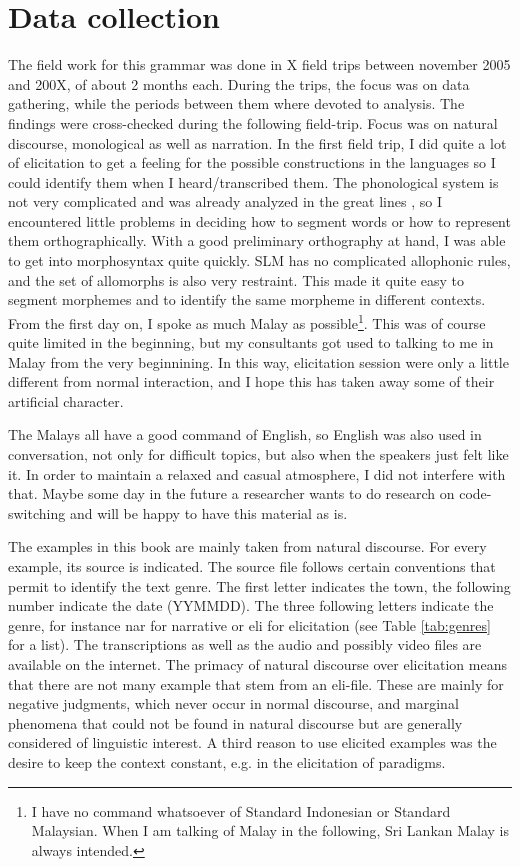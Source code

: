 \section{Data collection}
The field work for this grammar was done in X field trips between november 2005 and 200X, of about 2 months each. During the trips, the focus was on data gathering, while the periods between them where devoted to analysis. The findings were cross-checked during the following field-trip. Focus was on natural discourse, monological as well as narration. In the first field trip, I did quite a lot of elicitation to get a feeling for the possible constructions in the languages so I could identify them when I heard/transcribed them. The phonological system is not very complicated and was already analyzed in the great lines \citep{Bichsel}, so I encountered little problems in deciding how to segment words or how to represent them orthographically. With a good preliminary orthography at hand, I was able to get into morphosyntax quite quickly. SLM has no complicated allophonic rules, and the set of allomorphs is also very restraint. This made it quite easy to segment morphemes and to identify the same morpheme in different contexts. From the first day on, I spoke as much Malay as possible\footnote{I have no command whatsoever of Standard Indonesian or Standard Malaysian. When I am talking of Malay in the following, Sri Lankan Malay is always intended.}. This was of course quite limited in the beginning, but my consultants got used to talking to me in Malay from the very beginnining. In this way, elicitation session were only a little different from normal interaction, and I hope this has taken away some of their artificial character.

The Malays all have a good command of English, so English was also used in conversation, not only for difficult topics, but also when the speakers just felt like it. In order to maintain a relaxed and casual atmosphere, I did not interfere with that. Maybe some day in the future a researcher wants to do research on code-switching and will be happy to have this material as is.

The examples in this book are mainly taken from natural discourse. For every example, its source is indicated. The source file follows certain conventions that permit to identify the text genre. The first letter indicates the town, the following number indicate the date (YYMMDD). The three following letters indicate the genre, for instance nar for narrative or eli for elicitation (see Table \ref{tab:genres} for a list). The transcriptions as well as the audio and possibly video files are available on the internet. The primacy of natural discourse over elicitation means that there are not many example that stem from an eli-file. These are mainly for negative judgments, which never occur in normal discourse, and marginal phenomena that could not be found in natural discourse but are generally considered of linguistic interest. A third reason to use elicited examples was the desire to keep the context constant, e.g. in the elicitation of paradigms.

